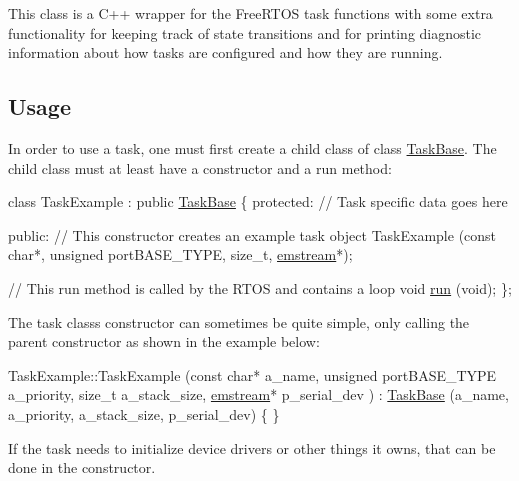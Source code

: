 This class is a C++ wrapper for the Free\+R\+T\+OS task functions with some extra functionality for keeping track of state transitions and for printing diagnostic information about how tasks are configured and how they are running.\hypertarget{index_Usage}{}\subsection{Usage}\label{index_Usage}
In order to use a task, one must first create a child class of class {\ttfamily \mbox{\hyperlink{class_task_base}{Task\+Base}}}. The child class must at least have a constructor and a run method\+: 
\begin{DoxyCode}
\textcolor{keyword}{class }TaskExample : \textcolor{keyword}{public} \mbox{\hyperlink{class_task_base}{TaskBase}}
\{
\textcolor{keyword}{protected}:
    \textcolor{comment}{// Task specific data goes here}

\textcolor{keyword}{public}:
    \textcolor{comment}{// This constructor creates an example task object}
       TaskExample (\textcolor{keyword}{const} \textcolor{keywordtype}{char}*, \textcolor{keywordtype}{unsigned} portBASE\_TYPE, \textcolor{keywordtype}{size\_t}, \mbox{\hyperlink{classemstream}{emstream}}*);

    \textcolor{comment}{// This run method is called by the RTOS and contains a loop }
    \textcolor{keywordtype}{void} \mbox{\hyperlink{class_task_base_adcf6036ad9c860051ccf392ba5e7dbbc}{run}} (\textcolor{keywordtype}{void});
\};
\end{DoxyCode}


The task class\textquotesingle{}s constructor can sometimes be quite simple, only calling the parent constructor as shown in the example below\+: 
\begin{DoxyCode}
TaskExample::TaskExample (\textcolor{keyword}{const} \textcolor{keywordtype}{char}* a\_name,
                          \textcolor{keywordtype}{unsigned} portBASE\_TYPE a\_priority,
                          \textcolor{keywordtype}{size\_t} a\_stack\_size,
                          \mbox{\hyperlink{classemstream}{emstream}}* p\_serial\_dev
                         )
    : \mbox{\hyperlink{class_task_base}{TaskBase}} (a\_name, a\_priority, a\_stack\_size, p\_serial\_dev)
\{
\}
\end{DoxyCode}
 If the task needs to initialize device drivers or other things it owns, that can be done in the constructor.

